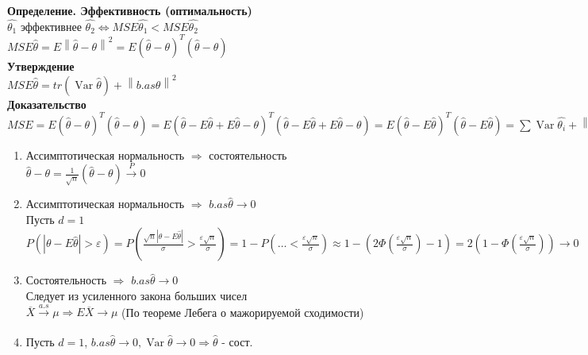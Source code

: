 \documentclass{article}
\newcommand\0{\mathbb{0}}
\DeclareMathOperator{\Var}{Var}
\newcommand\1{\mathbb{1}}
\newcommand{\norm}[1]{\left\lVert#1\right\rVert}
\begin{document}
\textbf{Определение. Эффективность (оптимальность)}\\
$\widehat{\theta_1}$ эффективнее $\widehat{\theta_2} \Leftrightarrow MSE\widehat{\theta_1} < MSE\widehat{\theta_2}$\\
$MSE\widehat{\theta} = E\norm{\widehat{\theta} - \theta}^2 = E(\widehat{\theta} - \theta)^T(\widehat{\theta} - \theta)$\\
\textbf{Утверждение}\\
$MSE\widehat{\theta} = tr(\Var\widehat{\theta}) + \norm{b.as \widehat{\theta}}^2$\\
\textbf{Доказательство}\\
$MSE = E(\widehat{\theta} - \theta)^T(\widehat{\theta} - \theta) = E(\widehat{\theta} - E\widehat{\theta} + E\widehat{\theta} - \theta)^T(\widehat{\theta} - E\widehat{\theta} + E\widehat{\theta} - \theta) = E(\widehat{\theta} - E\widehat{\theta})^T(\widehat{\theta} - E\widehat{\theta}) = \displaystyle\sum \Var\widehat{\theta_i} + \norm{b.as \widehat{\theta}}^2$
\begin{enumerate}
    \item Ассимптотическая нормальность $\Rightarrow$ состоятельность\\
    $\widehat{\theta} - \theta = \frac{1}{\sqrt{n}}(\widehat{\theta} - \theta) \xrightarrow[]{P} 0$\\
    \item Ассимптотическая нормальность $\Rightarrow$ $b.as \widehat{\theta} \to 0$\\
    Пусть $d = 1$\\
    $P(|\theta - E\widehat{\theta}| > \varepsilon) = P(\frac{\sqrt{n}|\theta - E\widehat{\theta}|}{\sigma} > \frac{\varepsilon \sqrt{n}}{\sigma}) = 1 - P(\dots < \frac{\varepsilon \sqrt{n}}{\sigma}) \approx 1 - (2\Phi(\frac{\varepsilon \sqrt{n}}{\sigma}) - 1) = 2(1 - \Phi(\frac{\varepsilon \sqrt{n}}{\sigma})) \to 0$
    \item Состоятельность $\Rightarrow$ $b.as \widehat{\theta} \to 0$\\
    Следует из усиленного закона больших чисел\\
    $\overline{X} \xrightarrow[]{a.s} \mu \Rightarrow E\overline{X} \to \mu$ (По теореме Лебега о мажорируемой сходимости)
    \item Пусть $d = 1$, $b.as \widehat{\theta} \to 0, \Var\widehat{\theta} \to 0 \Rightarrow \widehat{\theta}$ - сост.
\end{enumerate}
\end{document}
